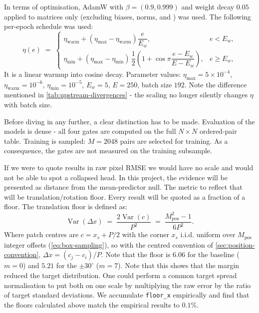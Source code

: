 \documentclass[final_report.tex]{subfiles}
\begin{document}
In terms of optimisation, AdamW with $\beta = (0.9, 0.999)$ and weight decay $0.05$ applied to matrices only (excluding biases, norms,  and ) was used. The following per-epoch schedule was used:
\begin{equation}\label{eq:lr-schedule}
  \eta(e) \;=\;
  \begin{cases}
    \eta_{\mathrm{warm}} + (\eta_{\max} - \eta_{\mathrm{warm}})\dfrac{e}{E_w},
      & e < E_w, \\[10pt]
    \eta_{\min} + (\eta_{\max} - \eta_{\min})\,\dfrac{1}{2}\!\left(1 + \cos \pi \dfrac{e - E_w}{E - E_w}\right),
      & e \geq E_w,
  \end{cases}
\end{equation}
It is a linear warmup into cosine decay. Parameter values: $\eta_{\max} = 5\!\times\!10^{-4}$, $\eta_{\mathrm{warm}} = 10^{-6}$,
$\eta_{\min} = 10^{-5}$, $E_w = 5$, $E = 250$, batch size $192$. Note the difference mentioned in \cref{tab:upstream-divergences} - the scaling no longer silently changes $\eta$ with batch size.

Before diving in any further, a clear distinction has to be made. Evaluation of the models is dense - all four gates are computed on the full $N\times N$ ordered-pair table. Training is sampled: $M=2048$ pairs are selected for training. As a consequence, the gates are not measured on the training subsample.

If we were to quote results in raw pixel RMSE we would have no scale and would not be able to spot a collapsed head. In this project, the evidence will be presented as distance from the mean-predictor null. The metric to reflect that will be translation/rotation floor. Every result will be quoted as a fraction of a floor. The translation floor is defined as:
\begin{equation}\label{eq:trans-floor}
  \operatorname{Var}(\Delta x)
  \;=\; \frac{2\operatorname{Var}(c)}{P^2}
  \;=\; \frac{M_{\text{pos}}^{2} - 1}{6 P^{2}} .
\end{equation}
Where patch centres are $c=x_s+P/2$ with the corner $x_s$ i.i.d. uniform over $M_{\text{pos}}$ integer offsets (\cref{eq:box-sampling}), so with the centred convention of \cref{sec:position-convention}, $\Delta x = (c_j - c_i)/P$. Note that the floor is $6.06$ for the baseline ($m=0$) and $5.21$ for the $\pm30^\circ$ ($m=7$). Note that this shows that the margin reduced the target distribution. One could perform a common target spread normalisation to put both on one scale by multiplying the raw error by the ratio of target standard deviations. We accumulate \texttt{floor\_x} empirically and find that the floors calculated above match the empirical results to $0.1\%$. 
\end{document}
